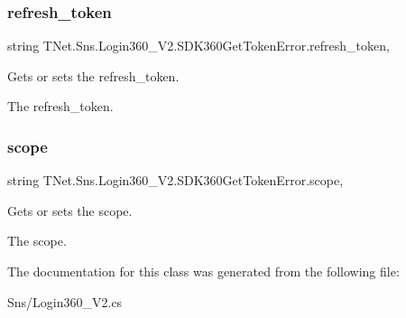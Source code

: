 \subsubsection{\texorpdfstring{refresh\+\_\+token}{refresh\_token}}
{\footnotesize\ttfamily string T\+Net.\+Sns.\+Login360\+\_\+\+V2.\+S\+D\+K360\+Get\+Token\+Error.\+refresh\+\_\+token\hspace{0.3cm}{\ttfamily [get]}, {\ttfamily [set]}}



Gets or sets the refresh\+\_\+token. 

The refresh\+\_\+token.\mbox{\label{class_t_net_1_1_sns_1_1_login360___v2_1_1_s_d_k360_get_token_error_a021fb9665f3010db8bf348789cc8eb7c}} 
\subsubsection{\texorpdfstring{scope}{scope}}
{\footnotesize\ttfamily string T\+Net.\+Sns.\+Login360\+\_\+\+V2.\+S\+D\+K360\+Get\+Token\+Error.\+scope\hspace{0.3cm}{\ttfamily [get]}, {\ttfamily [set]}}



Gets or sets the scope. 

The scope.

The documentation for this class was generated from the following file\+:\begin{DoxyCompactItemize}
\item 
Sns/Login360\+\_\+\+V2.\+cs\end{DoxyCompactItemize}

